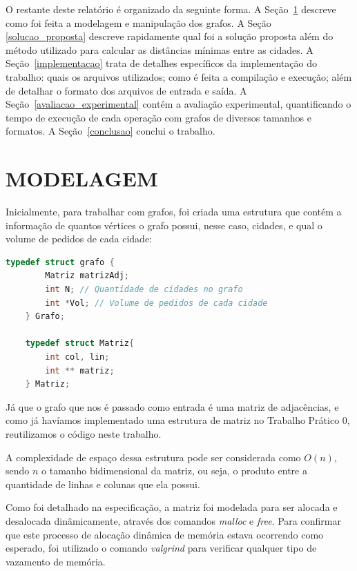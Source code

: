 \documentclass[12pt]{article}
\begin{document}
	O restante deste relatório é organizado da seguinte forma. A Seção~\ref{modelagem} descreve como foi feita a modelagem e manipulação dos grafos. A Seção \ref{solucao_proposta} descreve rapidamente qual foi a solução proposta além do método utilizado para calcular as distâncias mínimas entre as cidades. A Seção~\ref{implementacao} trata de detalhes específicos da implementação do trabalho: quais os arquivos utilizados; como é feita a compilação e execução; além de detalhar o formato dos arquivos de entrada e saída. A Seção~\ref{avaliacao_experimental} contém a avaliação experimental, quantificando o tempo de execução de cada operação com grafos de diversos tamanhos e formatos. A Seção~\ref{conclusao} conclui o trabalho.


\section{MODELAGEM}
\label{modelagem}

	Inicialmente, para trabalhar com grafos, foi criada uma estrutura que contém a informação de quantos vértices o grafo possui, nesse caso, cidades, e qual o volume de pedidos de cada cidade:

    \begin{lstlisting}[language=c]
    typedef struct grafo {
        Matriz matrizAdj;
        int N; // Quantidade de cidades no grafo
        int *Vol; // Volume de pedidos de cada cidade
    } Grafo;

    typedef struct Matriz{
        int col, lin;
        int ** matriz;
    } Matriz;

    \end{lstlisting}

    Já que o grafo que nos é passado como entrada é uma matriz de adjacências, e como já havíamos implementado uma estrutura de matriz no Trabalho Prático 0, reutilizamos o código neste trabalho.

	A complexidade de espaço dessa estrutura pode ser considerada como $O(n)$, sendo $n$ o tamanho bidimensional da matriz, ou seja, o produto entre a quantidade de linhas e colunas que ela possui.

	Como foi detalhado na especificação, a matriz foi modelada para ser alocada e desalocada dinâmicamente, através dos comandos \textit{malloc} e \textit{free}. Para confirmar que este processo de alocação dinâmica de memória estava ocorrendo como esperado, foi utilizado o comando \textit{valgrind} para verificar qualquer tipo de vazamento de memória.
\end{document}
